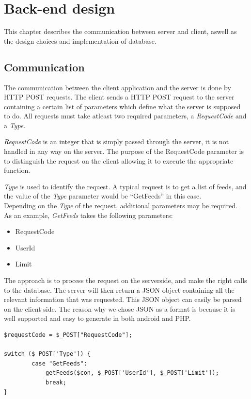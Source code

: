 \chapter{Back-end design}
This chapter describes the communication between server and client, aswell as the design choices and
implementation of database. 

\section{Communication}
\label{sec:com}

The communication between the client application and the server is done by HTTP POST requests.
The client sends a HTTP POST request to the server containing a certain list of parameters which
define what the server is supposed to do. All requests must take atleast two required parameters, a \textit{RequestCode} and a
\textit{Type}.

\textit{RequestCode} is an integer that is simply passed through the server, it is not handled in any
way on the server. The purpose of the RequestCode parameter is to distinguish the request on the client allowing
it to execute the appropriate function.

\textit{Type} is used to identify the request. A typical request is to get a list of feeds, and the
value of the \textit{Type} parameter would be ``GetFeeds'' in this case.\\

Depending on the \textit{Type} of the request, additional parameters may be required.\\

As an example, \textit{GetFeeds} takes the following parameters:
\begin{itemize}
\item RequestCode
\item UserId
\item Limit
\end{itemize}

The approach is to process the request on the serverside, and make the right calls to the
database. The server will then return a JSON object containing all the relevant information that was
requested. This JSON object can easily be parsed on the client side. The reason why we chose JSON as
a format is because it is well supported and easy to generate in both android and PHP.

\begin{lstlisting}[language=phpstyle, caption=getFeeds function call]
$requestCode = $_POST["RequestCode"];

switch ($_POST['Type']) {
        case "GetFeeds":
            getFeeds($con, $_POST['UserId'], $_POST['Limit']);
            break;
}
\end{lstlisting}

